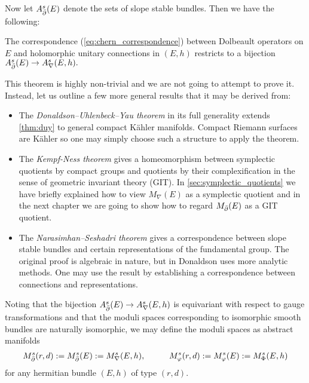 \documentclass[12pt]{ociamthesis}  %
\begin{document}
Now let $A^s_{\bar{\partial}}(E)$ denote the sets of slope stable bundles. Then we
have the following:

\begin{theorem}\label{thm:duy}
  The correspondence (\ref{eq:chern_correspondence}) between
  Dolbeault operators on $E$ and holomorphic unitary connections in $(E,h)$
  restricts to a bijection $A^s_{\bar{\partial}}(E) \to A^s_\nabla(E,h).$
\end{theorem}

This theorem is highly non-trivial and we are not going to attempt
to prove it. Instead, let us outline a few more general results
that it may be derived from:

\begin{itemize}
  \item The \emph{Donaldson–Uhlenbeck–Yau theorem}
        \cite{donaldson1985,uy1986}
        in its full generality extends \ref{thm:duy} to general compact
        K\"ahler manifolds. Compact Riemann surfaces
        are K\"ahler so one may simply choose such a structure to
        apply the theorem.
  \item The \emph{Kempf-Ness theorem} \cite{kn1979} gives a homeomorphism between
        symplectic quotients by compact groups and quotients by their
        complexification in the sense of geometric invariant theory (GIT). In
        \ref{sec:symplectic_quotients} we have briefly
        explained how to view $M_\nabla(E)$ as a symplectic quotient
        and in the next chapter we are going to show how to regard
        $M_{\bar{\partial}}(E)$ as a GIT quotient.
  \item The \emph{Narasimhan–Seshadri theorem} \cite{ns1965} gives
        a correspondence between slope stable bundles and certain representations
        of the fundamental group. The original proof is algebraic in nature, but in \cite{donaldson1983} Donaldson
        uses more analytic methods. One may use the result by establishing
        a correspondence between connections and representations.
\end{itemize}

Noting that the bijection $A^s_{\bar{\partial}}(E)\to A^s_\nabla(E,h)$ is
equivariant with respect to gauge transformations and that the moduli spaces corresponding
to isomorphic smooth bundles are naturally isomorphic, we may define
the moduli spaces as abstract manifolds
\begin{align}\label{eq:abstract_analytic_spaces}
  M^s_{\bar{\partial}}(r,d) := M^s_{\bar{\partial}}(E) := M^s_\nabla(E,h), \hspace{1cm}
  M^s_\varphi(r,d) := M^s_\varphi(E) := M^s_\Phi(E,h)
\end{align}
for any hermitian bundle $(E,h)$ of type $(r,d)$.
\end{document}
